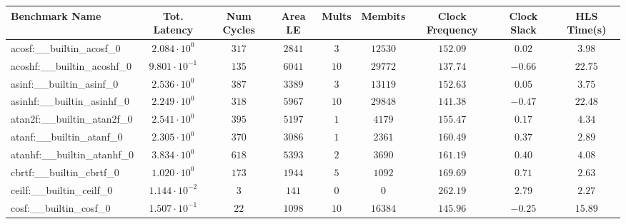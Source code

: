 \begin{tabular}{|l|c|c|c|c|c|c|c|c|}
\hline
Benchmark Name                            & Tot. Latency            & Num Cycles & Area LE    & Mults   & Membits    & Clock Frequency & Clock Slack & HLS Time(s) \\
\hline
acosf:\_\_builtin\_acosf\_0               & $ 2.084 \cdot 10^{0}  $ & $ 317    $ & $ 2841   $ & $ 3   $ & $ 12530  $ & $ 152.09      $ & $ 0.02    $ & $ 3.98    $ \\
acoshf:\_\_builtin\_acoshf\_0             & $ 9.801 \cdot 10^{-1} $ & $ 135    $ & $ 6041   $ & $ 10  $ & $ 29772  $ & $ 137.74      $ & $ -0.66   $ & $ 22.75   $ \\
asinf:\_\_builtin\_asinf\_0               & $ 2.536 \cdot 10^{0}  $ & $ 387    $ & $ 3389   $ & $ 3   $ & $ 13119  $ & $ 152.63      $ & $ 0.05    $ & $ 3.75    $ \\
asinhf:\_\_builtin\_asinhf\_0             & $ 2.249 \cdot 10^{0}  $ & $ 318    $ & $ 5967   $ & $ 10  $ & $ 29848  $ & $ 141.38      $ & $ -0.47   $ & $ 22.48   $ \\
atan2f:\_\_builtin\_atan2f\_0             & $ 2.541 \cdot 10^{0}  $ & $ 395    $ & $ 5197   $ & $ 1   $ & $ 4179   $ & $ 155.47      $ & $ 0.17    $ & $ 4.34    $ \\
atanf:\_\_builtin\_atanf\_0               & $ 2.305 \cdot 10^{0}  $ & $ 370    $ & $ 3086   $ & $ 1   $ & $ 2361   $ & $ 160.49      $ & $ 0.37    $ & $ 2.89    $ \\
atanhf:\_\_builtin\_atanhf\_0             & $ 3.834 \cdot 10^{0}  $ & $ 618    $ & $ 5393   $ & $ 2   $ & $ 3690   $ & $ 161.19      $ & $ 0.40    $ & $ 4.08    $ \\
cbrtf:\_\_builtin\_cbrtf\_0               & $ 1.020 \cdot 10^{0}  $ & $ 173    $ & $ 1944   $ & $ 5   $ & $ 1092   $ & $ 169.69      $ & $ 0.71    $ & $ 2.63    $ \\
ceilf:\_\_builtin\_ceilf\_0               & $ 1.144 \cdot 10^{-2} $ & $ 3      $ & $ 141    $ & $ 0   $ & $ 0      $ & $ 262.19      $ & $ 2.79    $ & $ 2.27    $ \\
cosf:\_\_builtin\_cosf\_0                 & $ 1.507 \cdot 10^{-1} $ & $ 22     $ & $ 1098   $ & $ 10  $ & $ 16384  $ & $ 145.96      $ & $ -0.25   $ & $ 15.89   $ \\

\end{tabular}
